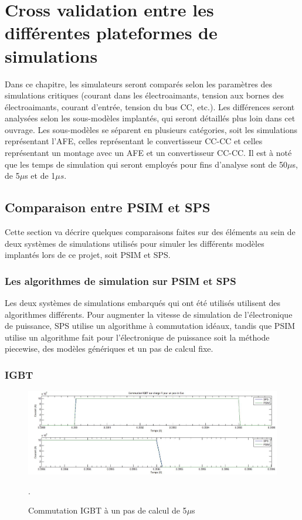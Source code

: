 \documentclass[11pt,letterpaper,final]{report}
\begin{document}
\chapter{Cross validation entre les différentes plateformes de simulations}
Dans ce chapitre, les simulateurs seront comparés selon les paramètres des simulations critiques (courant dans les électroaimants, tension aux bornes des électroaimants, courant d'entrée, tension du bus CC, etc.). Les différences seront analysées selon les sous-modèles implantés, qui seront détaillés plus loin dans cet ouvrage. Les sous-modèles se séparent en plusieurs catégories, soit les simulations représentant l'AFE, celles représentant le convertisseur CC-CC et celles représentant un montage avec un AFE et un convertisseur CC-CC. Il est à noté que les temps de simulation qui seront employés pour fins d'analyse sont de 50$\mu$s, de 5$\mu$s et de 1$\mu s$. 

\section{Comparaison entre PSIM et SPS}
Cette section va décrire quelques comparaisons faites sur des éléments au sein de deux systèmes de simulations utilisés pour simuler les différents modèles implantés lors de ce projet, soit PSIM et SPS.

\subsection{Les algorithmes de simulation sur PSIM et SPS}
Les deux systèmes de simulations embarqués qui ont été utilisés utilisent des algorithmes différents. Pour augmenter la vitesse de simulation de l'électronique de puissance, SPS utilise un algorithme à commutation idéaux, tandis que PSIM utilise un algorithme fait pour l'électronique de puissance soit la méthode piecewise, des modèles génériques et un pas de calcul fixe.

\subsection{IGBT}

\begin{figure}[htb]
\centering
\includegraphics[scale=0.5]{Fig/Comp/IGBT.jpg}
\caption{Commutation IGBT à un pas de calcul de 5$\mu$s}.
\label{IG}
\end{figure}
\end{document}
